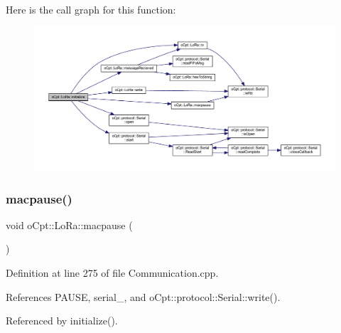 Here is the call graph for this function\+:\nopagebreak
\begin{figure}[H]
\begin{center}
\leavevmode
\includegraphics[width=350pt]{classo_cpt_1_1_lo_ra_aa0646143f843d43fcd680344dfcb2a14_cgraph}
\end{center}
\end{figure}
\hypertarget{classo_cpt_1_1_lo_ra_ac1042fa7b446ce798317a529b6425a4f}{}\label{classo_cpt_1_1_lo_ra_ac1042fa7b446ce798317a529b6425a4f} 
\subsubsection{\texorpdfstring{macpause()}{macpause()}}
{\footnotesize\ttfamily void o\+Cpt\+::\+Lo\+Ra\+::macpause (\begin{DoxyParamCaption}{ }\end{DoxyParamCaption})\hspace{0.3cm}{\ttfamily [protected]}}



Definition at line 275 of file Communication.\+cpp.



References P\+A\+U\+SE, serial\+\_\+, and o\+Cpt\+::protocol\+::\+Serial\+::write().



Referenced by initialize().


